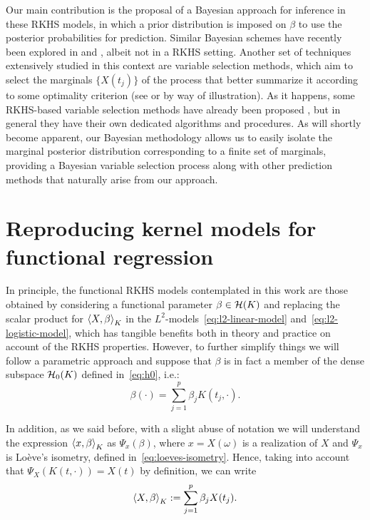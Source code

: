 Our main contribution is the proposal of a Bayesian approach for inference in these \acs{RKHS} models, in which a prior distribution is imposed on \(\beta\) to use the posterior probabilities for prediction. Similar Bayesian schemes have recently been explored in \citet{grollemund2019bayesian} and \citet{abraham2024informative}, albeit not in a \acs{RKHS} setting. Another set of techniques extensively studied in this context are variable selection methods, which aim to select the marginals \(\{X(t_j)\}\) of the process that better summarize it according to some optimality criterion (see \citealp{ferraty2010most} or \citealp{berrendero2016variable} by way of illustration). As it happens, some \acs{RKHS}-based variable selection methods have already been proposed \citep[e.g.][]{bueno2019variable}, but in general they have their own dedicated algorithms and procedures. As will shortly become apparent, our Bayesian methodology allows us to easily isolate the marginal posterior distribution corresponding to a finite set of marginals, providing a Bayesian variable selection process along with other prediction methods that naturally arise from our approach.

\section{Reproducing kernel models for functional regression}

In principle, the functional \acs{RKHS} models contemplated in this work are those obtained by considering a functional parameter \(\beta \in \mathcal{H}(K)\) and replacing the scalar product for \(\left\langle X,\beta\right\rangle_K\) in the \(L^2\)-models~\eqref{eq:l2-linear-model} and~\eqref{eq:l2-logistic-model}, which has tangible benefits both in theory and practice on account of the \acs{RKHS} properties. However, to further simplify things we will follow a parametric approach and suppose that \(\beta\) is in fact a member of the dense subspace \(\mathcal{H}_0(K)\) defined in~\eqref{eq:h0}, i.e.:
\begin{equation}\label{eq:beta}
  \beta(\cdot) = \sum_{j=1}^p \beta_j K(t_j, \cdot).
\end{equation}

In addition, as we said before, with a slight abuse of notation we will understand the expression \(\left\langle x,\beta\right\rangle_K\) as \(\Psi_x(\beta)\), where \(x=X(\omega)\) is a realization of \(X\) and \(\Psi_x\) is Loève's isometry, defined in~\eqref{eq:loeves-isometry}. Hence, taking into account that \(\Psi_X(K(t, \cdot)) = X(t)\) by definition, we can write 
\[
  \left\langle X,\beta\right\rangle_K := \sum_{j=1}^p \beta_j X(t_j).
\]

